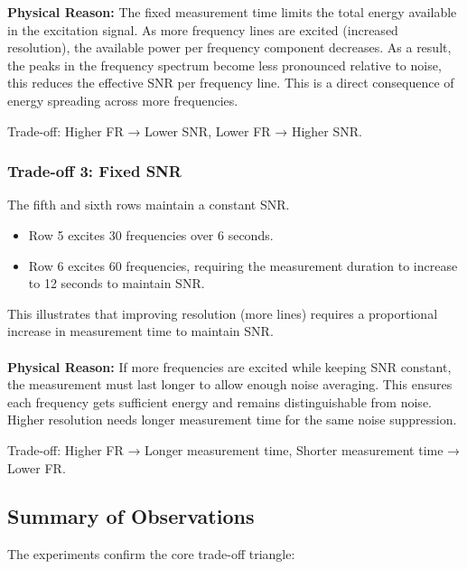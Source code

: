 \documentclass[a4paper,12pt]{article}
\begin{document}
\textbf{Physical Reason:} 
The fixed measurement time limits the total energy available in the excitation signal. As more frequency lines are excited (increased resolution), the available power per frequency component decreases. As a result, the peaks in the frequency spectrum become less pronounced relative to noise, this reduces the effective SNR per frequency line. This is a direct consequence of energy spreading across more frequencies. 

Trade-off: Higher FR → Lower SNR, Lower FR → Higher SNR.

\subsubsection*{Trade-off 3: Fixed SNR}
The fifth and sixth rows maintain a constant SNR.
\begin{itemize}
    \item Row 5 excites 30 frequencies over 6 seconds.
    \item Row 6 excites 60 frequencies, requiring the measurement duration to increase to 12 seconds to maintain SNR.
\end{itemize}
This illustrates that improving resolution (more lines) requires a proportional increase in measurement time to maintain SNR.
\\
\\
\textbf{Physical Reason:} 
If more frequencies are excited while keeping SNR constant, the measurement must last longer to allow enough noise averaging. This ensures each frequency gets sufficient energy and remains distinguishable from noise. Higher resolution needs longer measurement time for the same noise suppression.

Trade-off: Higher FR → Longer measurement time, Shorter measurement time → Lower FR.
\subsection*{Summary of Observations}
The experiments confirm the core trade-off triangle:

\begin{center}
\end{center}
\end{document}
